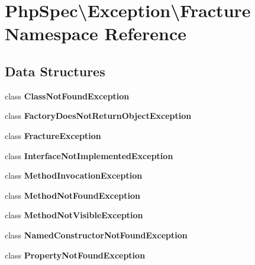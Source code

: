 \section{Php\+Spec\textbackslash{}Exception\textbackslash{}Fracture Namespace Reference}
\label{namespace_php_spec_1_1_exception_1_1_fracture}
\subsection*{Data Structures}
\begin{DoxyCompactItemize}
\item 
class {\bf Class\+Not\+Found\+Exception}
\item 
class {\bf Factory\+Does\+Not\+Return\+Object\+Exception}
\item 
class {\bf Fracture\+Exception}
\item 
class {\bf Interface\+Not\+Implemented\+Exception}
\item 
class {\bf Method\+Invocation\+Exception}
\item 
class {\bf Method\+Not\+Found\+Exception}
\item 
class {\bf Method\+Not\+Visible\+Exception}
\item 
class {\bf Named\+Constructor\+Not\+Found\+Exception}
\item 
class {\bf Property\+Not\+Found\+Exception}
\end{DoxyCompactItemize}
